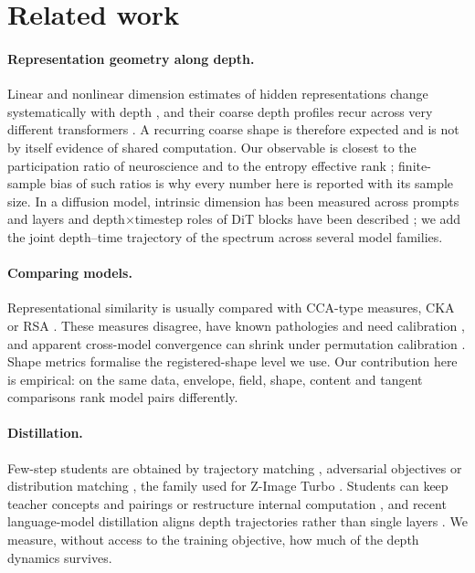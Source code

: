 \documentclass[11pt]{article}
\begin{document}
\section{Related work}\label{sec:related}

\paragraph{Representation geometry along depth.} Linear and nonlinear dimension estimates of hidden representations change systematically with depth \citep{ansuini2019intrinsic,recanatesi2019dimensionality}, and their coarse depth profiles recur across very different transformers \citep{valeriani2023geometry,cheng2025emergence}. A recurring coarse shape is therefore expected and is not by itself evidence of shared computation. Our observable is closest to the participation ratio of neuroscience \citep{gao2017theory,litwinkumar2017optimal} and to the entropy effective rank \citep{roy2007effective,garrido2023rankme}; finite-sample bias of such ratios \citep{chun2026estimating} is why every number here is reported with its sample size. In a diffusion model, intrinsic dimension has been measured across prompts and layers \citep{kvinge2023exploring} and depth$\times$timestep roles of DiT blocks have been described \citep{chen2024deltadit}; we add the joint depth--time trajectory of the spectrum across several model families.

\paragraph{Comparing models.} Representational similarity is usually compared with CCA-type measures, CKA or RSA \citep{raghu2017svcca,morcos2018insights,kornblith2019similarity,kriegeskorte2008representational}. These measures disagree, have known pathologies and need calibration \citep{ding2021grounding,davari2023reliability,cui2022deconfounded,klabunde2025similarity}, and apparent cross-model convergence \citep{huh2024platonic} can shrink under permutation calibration \citep{groger2026revisiting}. Shape metrics \citep{williams2021generalized} formalise the registered-shape level we use. Our contribution here is empirical: on the same data, envelope, field, shape, content and tangent comparisons rank model pairs differently.

\paragraph{Distillation.} Few-step students are obtained by trajectory matching \citep{salimans2022progressive,song2023consistency}, adversarial objectives \citep{sauer2024adversarial,sauer2024fast} or distribution matching \citep{yin2024onestep,yin2024improved}, the family used for Z-Image Turbo \citep{liu2025decoupled}. Students can keep teacher concepts and pairings \citep{gandikota2026distilling,surkov2025onestep,li2026why} or restructure internal computation \citep{haskins2025distilled}, and recent language-model distillation aligns depth trajectories rather than single layers \citep{chi2026mta}. We measure, without access to the training objective, how much of the depth dynamics survives.
\end{document}
